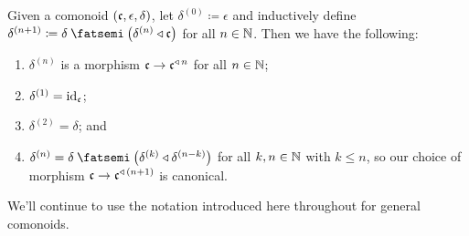 \documentclass[Book-Poly]{subfiles}
\begin{document}
\begin{proposition} \label{prop.n_duplication}
Given a comonoid $(\mathfrak{c},\epsilon,\delta)$, let $\delta^{(0)}\coloneqq\epsilon$ and inductively define $\delta^{(n+1)}\coloneqq\delta\then\left(\delta^{(n)}\tri\ema{c}\right)$ for all $n\in\mathbb{N}$.
Then we have the following:
\begin{enumerate}[label=(\alph*)]
    \item $\delta^{(n)}$ is a morphism $\mathfrak{c}\to\mathfrak{c}^{\mathbin{\triangleleft}\,n}$ for all $n\in\mathbb{N}$;
    \item $\delta^{(1)}=\mathrm{id}_{\mathfrak{c}}$;
    \item $\delta^{(2)}=\delta$; and
    \item $\delta^{(n)}=\delta\then\left(\delta^{(k)}\tri\delta^{(n-k)}\right)$ for all $k,n\in\mathbb{N}$ with $k\leq n$, so our choice of morphism $\mathfrak{c}\to\mathfrak{c}^{\mathbin{\triangleleft}\,(n+1)}$ is canonical. %
\end{enumerate}
\end{proposition}


We'll continue to use the notation introduced here throughout for general comonoids.
\end{document}
